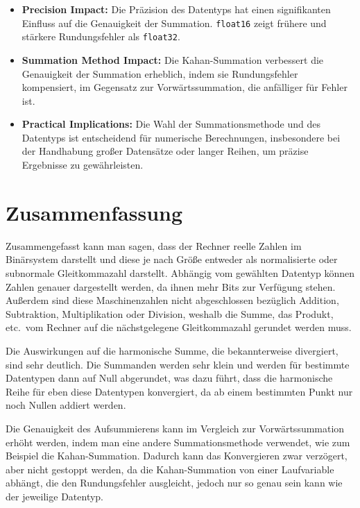 \documentclass{scrartcl}
\begin{document}
\begin{itemize}
    \item \textbf{Precision Impact:}
          Die Präzision des Datentyps hat einen signifikanten Einfluss auf die
          Genauigkeit der Summation.
          \texttt{float16} zeigt frühere und stärkere Rundungsfehler als \texttt{float32}.
    \item \textbf{Summation Method Impact:}
          Die Kahan-Summation verbessert die Genauigkeit der Summation erheblich, indem
          sie Rundungsfehler kompensiert, im Gegensatz zur Vorwärtssummation, die
          anfälliger für Fehler ist.
    \item \textbf{Practical Implications:}
          Die Wahl der Summationsmethode und des Datentyps ist entscheidend für
          numerische Berechnungen, insbesondere bei der Handhabung großer Datensätze oder
          langer Reihen, um präzise Ergebnisse zu gewährleisten.
\end{itemize}

\section{Zusammenfassung}
Zusammengefasst kann man sagen, dass der Rechner reelle Zahlen im Binärsystem
darstellt und diese je nach Größe entweder als normalisierte oder subnormale
Gleitkommazahl darstellt. Abhängig vom gewählten Datentyp können Zahlen genauer
dargestellt werden, da ihnen mehr Bits zur Verfügung stehen. Außerdem sind
diese Maschinenzahlen nicht abgeschlossen bezüglich Addition, Subtraktion,
Multiplikation oder Division, weshalb die Summe, das Produkt, etc.\ vom Rechner
auf die nächstgelegene Gleitkommazahl gerundet werden muss.

Die Auswirkungen auf die harmonische Summe, die bekannterweise divergiert, sind
sehr deutlich. Die Summanden werden sehr klein und werden für bestimmte
Datentypen dann auf Null abgerundet, was dazu führt, dass die harmonische Reihe
für eben diese Datentypen konvergiert, da ab einem bestimmten Punkt nur noch
Nullen addiert werden.

Die Genauigkeit des Aufsummierens kann im Vergleich zur Vorwärtssummation
erhöht werden, indem man eine andere Summationsmethode verwendet, wie zum
Beispiel die Kahan-Summation. Dadurch kann das Konvergieren zwar verzögert,
aber nicht gestoppt werden, da die Kahan-Summation von einer Laufvariable
abhängt, die den Rundungsfehler ausgleicht, jedoch nur so genau sein kann wie
der jeweilige Datentyp.

\printbibliography


\end{document}

